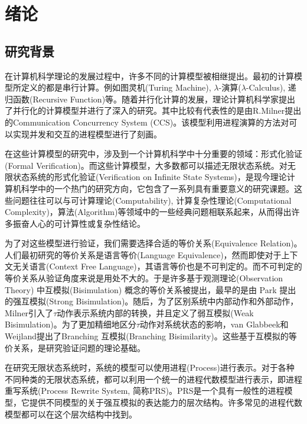 
\chapter{绪论}
\label{chap:intro}

\section{研究背景}
\label{sec:background}

在计算机科学理论的发展过程中，许多不同的计算模型被相继提出。最初的计算模型所定义的都是串行计算。例如图灵机(Turing Machine)\cite{Turing1936}, $\lambda$-演算($\lambda$-Calculus)\cite{Church1985}, 递归函数(Recursive Function)\cite{Rogers1967}等。随着并行化计算的发展，理论计算机科学家提出了并行化的计算模型并进行了深入的研究。其中比较有代表性的是由R.Milner提出的Communication Concurrency System (CCS)\cite{Milner1989}。该模型利用进程演算的方法对可以实现并发和交互的进程模型进行了刻画。

在这些计算模型的研究中，涉及到一个计算机科学中十分重要的领域：形式化验证(Formal Verification)。而这些计算模型，大多数都可以描述无限状态系统。对无限状态系统的形式化验证(Verification on Infinite State Systems)，是现今理论计算机科学中的一个热门的研究方向，它包含了一系列具有重要意义的研究课题。这些问题往往可以与可计算理论(Computability), 计算复杂性理论(Computational Complexity)，算法(Algorithm)等领域中的一些经典问题相联系起来，从而得出许多振奋人心的可计算性或复杂性结论。

为了对这些模型进行验证，我们需要选择合适的等价关系(Equivalence Relation)。人们最初研究的等价关系是语言等价(Language Equivalence)，然而即使对于上下文无关语言(Context Free Language)，其语言等价也是不可判定的\cite{Hopcroft1979}。而不可判定的等价关系从验证角度来说是用处不大的。于是许多基于观测理论(Observation Theory) 中互模拟(Bisimulation) 概念的等价关系被提出，最早的是由 Park 提出的强互模拟(Strong Bisimulation)\cite{Park1981}。随后，为了区别系统中内部动作和外部动作，Milner引入了$\tau$动作表示系统内部的转换，并且定义了弱互模拟(Weak Bisimulation)\cite{Milner1989}。为了更加精细地区分$\tau$动作对系统状态的影响，van Glabbeek和 Weijland提出了Branching 互模拟(Branching Bisimilarity)\cite{Glabbeek1996}。这些基于互模拟的等价关系，是研究验证问题的理论基础。

在研究无限状态系统时，系统的模型可以使用进程(Process)进行表示。对于各种不同种类的无限状态系统，都可以利用一个统一的进程代数模型进行表示，即进程重写系统(Process Rewrite System, 简称PRS)\cite{Mayr2000}。PRS是一个具有一般性的进程模型，它提供不同模型的关于强互模拟的表达能力的层次结构。许多常见的进程代数模型都可以在这个层次结构中找到。

